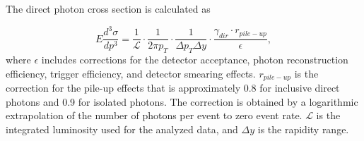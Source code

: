 \documentclass[twocolumn,letterpaper,aps,prl,longbibliography,superscriptaddress,floatfix]{revtex4-2}
\newcommand{\pT}{\ensuremath{p_T}}
\begin{document}
The direct photon cross section is calculated as

\begin{equation} \label{eq:xsecex}
E\frac{d^3\sigma}{dp^3} = \frac{1}{\mathcal{L}} \cdot \frac{1}{2\pi p_T} \cdot \frac{1}{\Delta p_T \Delta y} \cdot \frac{\gamma_{dir} \cdot r_{pile-up}}{\epsilon},
\end{equation}
where $\epsilon$ includes corrections for the detector acceptance, photon reconstruction efficiency, trigger efficiency, and detector smearing effects. $r_{pile-up}$ is the correction for the pile-up effects that is approximately 0.8 for inclusive direct photons and 0.9 for isolated photons. The correction is obtained by a logarithmic extrapolation of the number of photons per event to zero event rate. $\mathcal{L}$ is the integrated luminosity used for the analyzed data, and $\Delta y$ is the rapidity range. 

\end{document}
